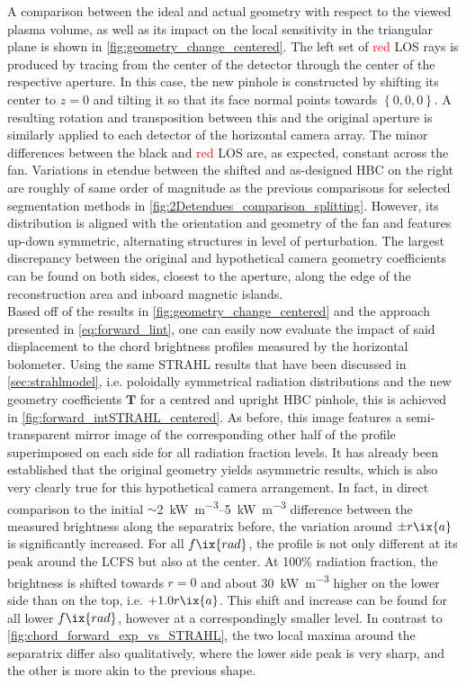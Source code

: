             A comparison between the ideal and actual geometry with respect to the viewed plasma volume, as well as its impact on the local sensitivity in the triangular plane is shown in \cref{fig:geometry_change_centered}. The left set of \textcolor{red}{red} LOS rays is produced by tracing from the center of the detector through the center of the respective aperture. In this case, the new pinhole is constructed by shifting its center to $z=0$ and tilting it so that its face normal points towards $\left\{0, 0, 0\right\}$. A resulting rotation and transposition between this and the original aperture is similarly applied to each detector of the horizontal camera array. The minor differences between the black and \textcolor{red}{red} LOS are, as expected, constant across the fan. Variations in etendue between the shifted and as-designed HBC on the right are roughly of same order of magnitude as the previous comparisons for selected segmentation methods in \cref{fig:2Detendues_comparison_splitting}. However, its distribution is aligned with the orientation and geometry of the fan and features up-down symmetric, alternating structures in level of perturbation. The largest discrepancy between the original and hypothetical camera geometry coefficients can be found on both sides, closest to the aperture, along the edge of the reconstruction area and inboard magnetic islands.\\%
            Based off of the results in \cref{fig:geometry_change_centered} and the approach presented in \cref{eq:forward_lint}, one can easily now evaluate the impact of said displacement to the chord brightness profiles measured by the horizontal bolometer. Using the same STRAHL results that have been discussed in \cref{sec:strahlmodel}, i.e. poloidally symmetrical radiation distributions and the new geometry coefficients $\mathbf{T}$ for a centred and upright HBC pinhole, this is achieved in \cref{fig:forward_intSTRAHL_centered}. As before, this image features a semi-transparent mirror image of the corresponding other half of the profile superimposed on each side for all radiation fraction levels. It has already been established that the original geometry yields asymmetric results, which is also very clearly true for this hypothetical camera arrangement. In fact, in direct comparison to the initial $\sim$\SIrange{2}{5}{\kilo\watt\per\cubic\meter} difference between the measured brightness along the separatrix before, the variation around $\pm r\ix{a}$ is significantly increased. For all $f\ix{rad}$, the profile is not only different at its peak around the LCFS but also at the center. At 100\% radiation fraction, the brightness is shifted towards $r=0$ and about \SI{30}{\kilo\watt\per\cubic\meter} higher on the lower side than on the top, i.e. $+1.0r\ix{a}$. This shift and increase can be found for all lower $f\ix{rad}$, however at a correspondingly smaller level. In contrast to \cref{fig:chord_forward_exp_vs_STRAHL}, the two local maxima around the separatrix differ also qualitatively, where the lower side peak is very sharp, and the other is more akin to the previous shape.\\%
